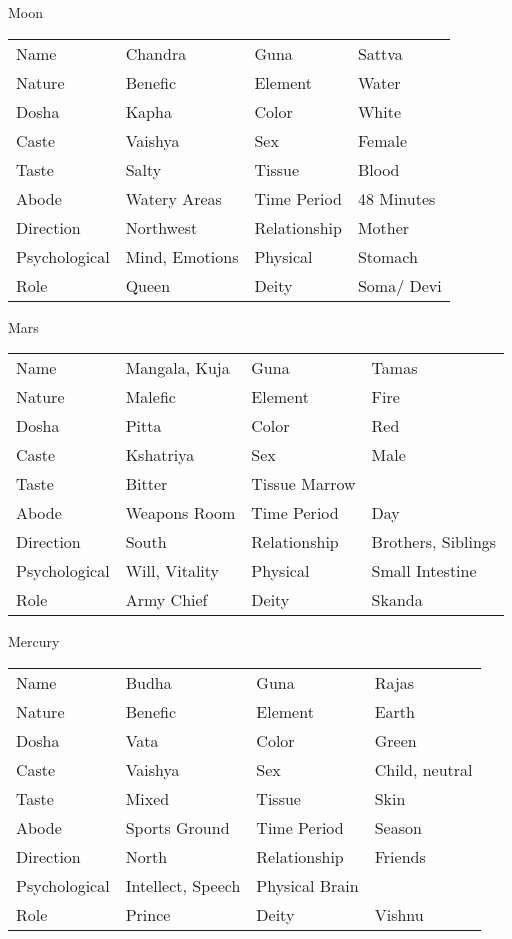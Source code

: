Moon
\begin{center}
\begin{tabular}{ l l l l}
Name	&Chandra	&Guna	&Sattva\\
Nature	&Benefic	&Element	&Water\\
Dosha	&Kapha	&Color	&White\\
Caste	&Vaishya	&Sex	&Female\\
Taste	&Salty	&Tissue	&Blood\\
Abode	&Watery Areas	&Time Period	&48 Minutes\\
Direction	&Northwest	&Relationship	&Mother\\
Psychological	&Mind, Emotions	&Physical	&Stomach\\
Role	&Queen	&Deity	&Soma/ Devi\\
 \end{tabular}
\end{center}

Mars
\begin{center}
\begin{tabular}{ l l l l}
Name	&Mangala, Kuja	&Guna	&Tamas\\
Nature	&Malefic	&Element	&Fire\\
Dosha	&Pitta	&Color	&Red\\
Caste	&Kshatriya	&Sex	&Male\\
Taste	&Bitter	&Tissue	Marrow\\
Abode	&Weapons Room	&Time Period	&Day\\
Direction	&South	&Relationship	&Brothers, Siblings\\
Psychological	&Will, Vitality	&Physical	&Small Intestine\\
Role	&Army Chief	&Deity	&Skanda\\
 \end{tabular}
\end{center}

Mercury
\begin{center}
\begin{tabular}{ l l l l}
Name	&Budha	&Guna	&Rajas\\
Nature	&Benefic	&Element	&Earth\\
Dosha	&Vata	&Color	&Green\\
Caste	&Vaishya	&Sex	&Child, neutral\\
Taste	&Mixed	&Tissue	&Skin\\
Abode	&Sports Ground	&Time Period	&Season\\
Direction	&North	&Relationship	&Friends\\
Psychological	&Intellect, Speech	&Physical	Brain\\
Role	&Prince	&Deity	&Vishnu\\
 \end{tabular}
\end{center}

